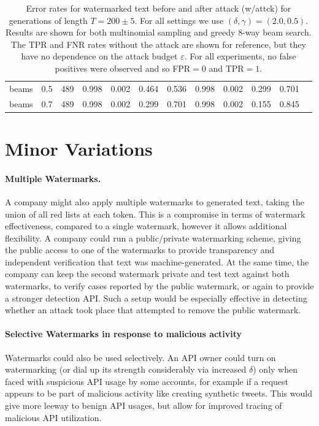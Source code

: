 \documentclass{article}
\theoremstyle{plain}
\theoremstyle{definition}
\theoremstyle{remark}
\begin{document}
\begin{table}
\begin{tabular}{lrrrrrrrrrrr}
        beams &            0.5 &    489 &            0.998 &            0.002 &                     0.464 &                     0.536 &            0.998 &            0.002 &                     0.299 &                     0.701 \\
        beams &            0.7 &    489 &            0.998 &            0.002 &                     0.299 &                     0.701 &            0.998 &            0.002 &                     0.155 &                     0.845 \\
\bottomrule
\end{tabular}
\caption{Error rates for watermarked text before and after attack (w/attck) for generations of length $T=200\pm5$. For all settings we use $(\delta,\gamma)=(2.0,0.5)$.  Results are shown for both multinomial sampling and greedy 8-way beam search. The TPR and FNR rates without the attack are shown for reference, but they have no dependence on the attack budget $\varepsilon.$  For all experiments, no false positives were observed and so FPR$=0$ and TPR$=1$.}
\label{tab:attacked-acc}
\end{table}



\section{Minor Variations}

\paragraph{Multiple Watermarks.} A company might also apply multiple watermarks to generated text, taking the union of all red lists at each token. This is a compromise in terms of watermark effectiveness, compared to a single watermark, however it allows additional flexibility. A company could run a public/private watermarking scheme, giving the public access to one of the watermarks to provide transparency and independent verification that text was machine-generated. At the same time, the company can keep the second watermark private and test text against both watermarks, to verify cases reported by the public watermark, or again to provide a stronger detection API. Such a setup would be especially effective in detecting whether an attack took place that attempted to remove the public watermark. 

\paragraph{Selective Watermarks in response to malicious activity}
Watermarks could also be used selectively. An API owner could turn on watermarking (or dial up its strength considerably via increased $\delta$) only when faced with suspicious API usage by some accounts, for example if a request appears to be part of malicious activity like creating synthetic tweets. This would give more leeway to benign API usages, but allow for improved tracing of malicious API utilization.
\end{document}

